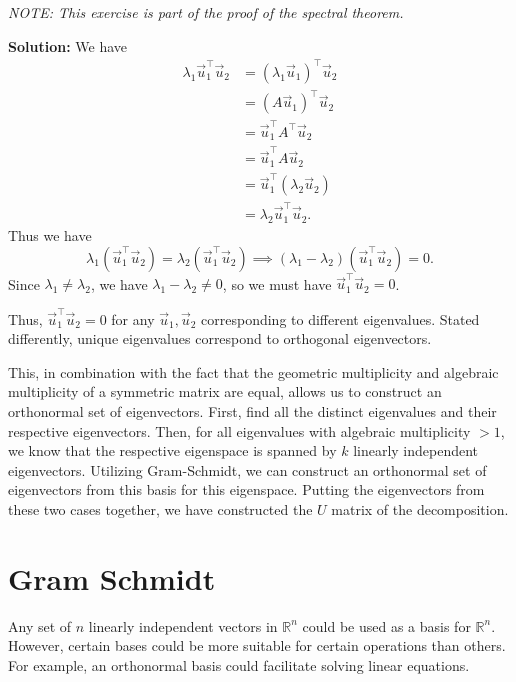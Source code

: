 \documentclass[10pt]{article}
\theoremstyle{definition}
\theoremstyle{plain}
\newcommand{\RR}{\mathbb{R}}
\newcommand{\vv}[1]{\vec{#1}}
\begin{document}
\textit{NOTE: This exercise is part of the proof of the spectral theorem.}

\textbf{Solution:} We have
\begin{align}
\lambda_1 \vv{u}_1^\top \vv{u}_2 &= (\lambda_1 \vv{u}_1)^\top \vv{u}_2 \\
&= (A\vv{u}_1)^\top \vv{u}_2 \\
&= \vv{u}_1^\top A^\top \vv{u}_2 \\
&= \vv{u}_1^\top A \vv{u}_2 \\
&= \vv{u}_1^\top (\lambda_2 \vv{u}_2) \\
&= \lambda_2 \vv{u}_1^\top \vv{u}_2.
\end{align}
Thus we have
\begin{equation}
\lambda_1 (\vv{u}_1^\top \vv{u}_2) = \lambda_2 (\vv{u}_1^\top \vv{u}_2) \implies (\lambda_1 - \lambda_2)(\vv{u}_1^\top \vv{u}_2) = 0.
\end{equation}
Since $\lambda_1 \neq \lambda_2$, we have $\lambda_1 - \lambda_2 \neq 0$, so we must have $\vv{u}_1^\top \vv{u}_2 = 0$.

Thus, $\vv{u}_1^\top \vv{u}_2 = 0$ for any $\vv{u}_1, \vv{u}_2$ corresponding to different eigenvalues. Stated differently, unique eigenvalues correspond to orthogonal eigenvectors.

This, in combination with the fact that the geometric multiplicity and algebraic multiplicity of a symmetric matrix are equal, allows us to construct an orthonormal set of eigenvectors. First, find all the distinct eigenvalues and their respective eigenvectors. Then, for all eigenvalues with algebraic multiplicity $> 1$, we know that the respective eigenspace is spanned by $k$ linearly independent eigenvectors. Utilizing Gram-Schmidt, we can construct an orthonormal set of eigenvectors from this basis for this eigenspace. Putting the eigenvectors from these two cases together, we have constructed the $U$ matrix of the decomposition.

\section{Gram Schmidt}

Any set of $n$ linearly independent vectors in $\RR^n$ could be used as a basis for $\RR^n$. However, certain bases could be more suitable for certain operations than others. For example, an orthonormal basis could facilitate solving linear equations.
\end{document}
